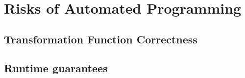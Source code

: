 \section{Risks of Automated Programming}
\label{sec:risks}

\subsection{Transformation Function Correctness}


\subsection{Runtime guarantees}
